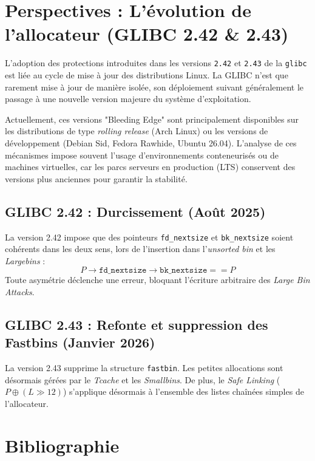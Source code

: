 \section{Perspectives : L'évolution de l'allocateur (GLIBC 2.42 \& 2.43)}
L'adoption des protections introduites dans les versions \texttt{2.42} et \texttt{2.43} de la \texttt{glibc} est liée au cycle de mise à jour des distributions Linux. La GLIBC n'est que rarement mise à jour de manière isolée, son déploiement suivant généralement le passage à une nouvelle version majeure du système d'exploitation.

Actuellement, ces versions "Bleeding Edge" sont principalement disponibles sur les distributions de type \textit{rolling release} (Arch Linux) ou les versions de développement (Debian Sid, Fedora Rawhide, Ubuntu 26.04). L'analyse de ces mécanismes impose souvent l'usage d'environnements conteneurisés ou de machines virtuelles, car les parcs serveurs en production (LTS) conservent des versions plus anciennes pour garantir la stabilité.
\subsection*{GLIBC 2.42 : Durcissement (Août 2025)}
La version 2.42 impose que des pointeurs \texttt{fd\_nextsize} et \texttt{bk\_nextsize} soient cohérents dans les deux sens, lors de l'insertion dans l'\textit{unsorted bin} et les \textit{Largebins} :
\[ P\rightarrow\texttt{fd\_nextsize}\rightarrow\texttt{bk\_nextsize} == P \]
Toute asymétrie déclenche une erreur, bloquant l'écriture arbitraire des \textit{Large Bin Attacks}.

\subsection*{GLIBC 2.43 : Refonte et suppression des Fastbins (Janvier 2026)}
La version 2.43 supprime la structure \texttt{fastbin}. Les petites allocations sont désormais gérées par le \textit{Tcache} et les \textit{Smallbins}. De plus, le \textit{Safe Linking} ($P \oplus (L \gg 12)$) s'applique désormais à l'ensemble des listes chaînées simples de l'allocateur.

\section{Bibliographie}

\nocite{*}

  {\list
     {}
     {\setlength{\leftmargin}{\bibhang}%
      \setlength{\itemindent}{-\leftmargin}%
      \setlength{\itemsep}{\bibitemsep}%
      \setlength{\parsep}{\bibparsep}}}
  {\endlist}
  {\item}

\printbibliography[keyword=video, heading=subbibliography, title={Vidéos}]
\printbibliography[keyword=git, heading=subbibliography, title={Dépôts Git / Ressources techniques}]
\printbibliography[keyword=web, heading=subbibliography, title={Sites Web / Articles en ligne}]
\printbibliography[keyword=thesis, heading=subbibliography, title={Mémoires universitaires}]
